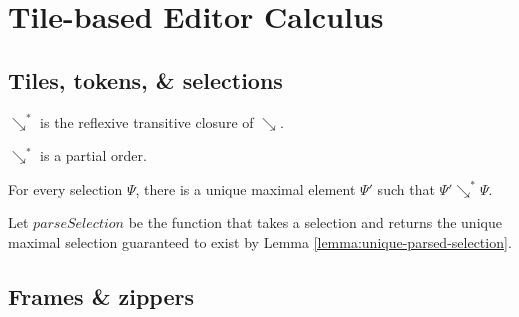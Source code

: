 
\section{Tile-based Editor Calculus}\label{sec:formalism}


\subsection{Tiles, tokens, \& selections}







\begin{definition}
  $\searrow^*$ is the reflexive transitive
  closure of $\searrow$.
\end{definition}

\begin{lemma}
  $\searrow^*$ is a partial order.
\end{lemma}

\begin{lemma}\label{lemma:unique-parsed-selection}
  For every selection $\Psi$, there is a unique maximal
  element $\Psi'$ such that $\Psi'\searrow^*\Psi$.
\end{lemma}

\begin{definition}
  Let $parseSelection$ be the function that takes a selection
  and returns the unique maximal selection guaranteed to exist
  by Lemma \ref{lemma:unique-parsed-selection}.
\end{definition}


\subsection{Frames \& zippers}





